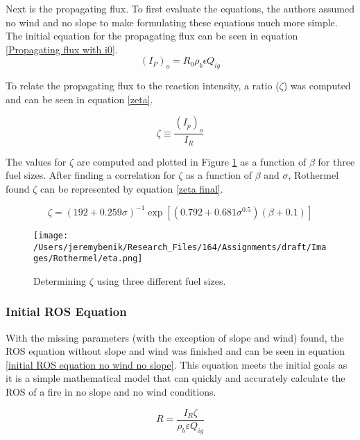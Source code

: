 \documentclass{article}
\begin{document}
\indent Next is the propagating flux. To first evaluate the equations, the authors assumed no wind and no slope to make formulating these equations much more simple. The initial equation for the propagating flux can be seen in equation \ref{Propagating flux with i0}.
\begin{equation}
	\label{Propagating flux with i0} 
	(I_P)_o = R_0 \rho _ b \epsilon Q_{ig}
\end{equation}

To relate the propagating flux to the reaction intensity, a ratio ($\zeta$) was computed and can be seen in equation \ref{zeta}.

\begin{equation}
	\label{zeta}
	\zeta \equiv \frac{(I_p)_o}{I_R}
\end{equation}

The values for $\zeta$ are computed and plotted in Figure \ref{rothermel_eta} as a function of $\beta$ for three fuel sizes. After finding a correlation for $\zeta$ as a function of $\beta$ and $\sigma$, Rothermel found $\zeta$ can be represented by equation \ref{zeta final}. 

\begin{equation}
	\label{zeta final}
	\zeta = (192 + 0.259 \sigma)^ {-1} \exp[(0.792 + 0.681 \sigma ^ {0.5})(\beta + 0.1)]
\end{equation}

\begin{figure}[!h]
\centering
  \texttt{[image: /Users/jeremybenik/Research\_Files/164/Assignments/draft/Images/Rothermel/eta.png]}
  \caption{Determining $\zeta$ using three different fuel sizes.}
  \label{rothermel_eta}
\end{figure}
\subsubsection{Initial ROS Equation}

With the missing parameters (with the exception of slope and wind) found, the ROS equation without slope and wind was finished and can be seen in equation \ref{initial ROS equation no wind no slope}. This equation meets the initial goals as it is a simple mathematical model that can quickly and accurately calculate the ROS of a fire in no slope and no wind conditions. 

\begin{equation}
	\label{initial ROS equation no wind no slope}
	R = \frac{I_R \zeta}{\rho _ b \varepsilon Q_{ig}}
\end{equation}
\end{document}
